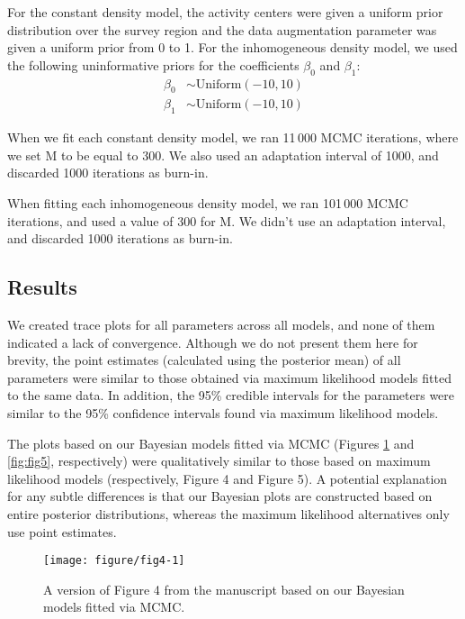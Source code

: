\documentclass[10pt,a4paper]{article}\usepackage[]{graphicx}\usepackage[]{xcolor}
\makeatletter
\def\maxwidth{ %
  \ifdim\Gin@nat@width>\linewidth
    \linewidth
  \else
    \Gin@nat@width
  \fi
}
\newenvironment{knitrout}{}{} %
\makeatother
\begin{document}
For the constant density model, the activity centers were given a
uniform prior distribution over the survey region and the data
augmentation parameter was given a uniform prior from 0 to 1. For the
inhomogeneous density model, we used the following uninformative
priors for the coefficients $\beta_0$ and $\beta_1$:
\begin{align*}
\beta_0 &\sim \text{Uniform}(-10, 10) \\
\beta_1 &\sim \text{Uniform}(-10, 10)
\end{align*}

When we fit each constant density model, we ran 11\,000 MCMC
iterations, where we set M to be equal to 300. We also used an
adaptation interval of 1000, and discarded 1000 iterations as burn-in.

When fitting each inhomogeneous density model, we ran 101\,000 MCMC
iterations, and used a value of 300 for M. We didn't use an
adaptation interval, and discarded 1000 iterations as burn-in.

\subsection{Results}
\label{sec:appendix-results}

We created trace plots for all parameters across all models, and none
of them indicated a lack of convergence. Although we do not present
them here for brevity, the point estimates (calculated using the
posterior mean) of all parameters were similar to those obtained
via maximum likelihood models fitted to the same data. In addition,
the 95\% credible intervals for the parameters were similar to the
95\% confidence intervals found via maximum likelihood models. 

The plots based on our Bayesian models fitted via MCMC (Figures
\ref{fig:fig4} and \ref{fig:fig5}, respectively) were qualitatively
similar to those based on maximum likelihood models (respectively,
Figure 4 and Figure 5). A
potential explanation for any subtle differences is that our Bayesian
plots are constructed based on entire posterior distributions, whereas
the maximum likelihood alternatives only use point estimates.

\begin{knitrout}
\color{fgcolor}\begin{figure}
\texttt{[image: figure/fig4-1]} \caption[A version of Figure 4 from the manuscript based on our Bayesian models fitted via MCMC]{A version of Figure 4 from the manuscript based on our Bayesian models fitted via MCMC.}\label{fig:fig4}
\end{figure}

\end{knitrout}
\end{document}
